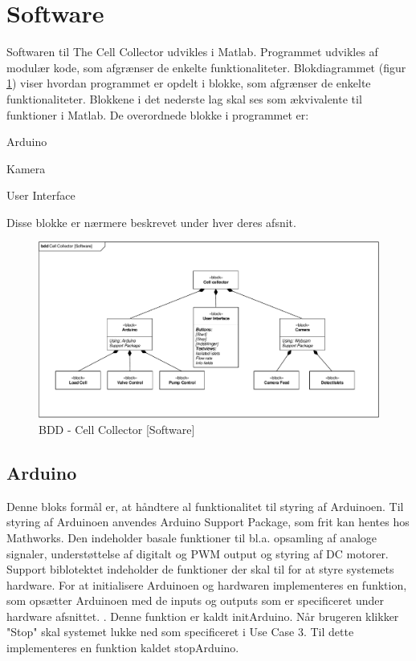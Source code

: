 \section{Software}
Softwaren til The Cell Collector udvikles i Matlab. Programmet udvikles af modulær kode, som afgrænser de enkelte funktionaliteter. Blokdiagrammet (figur \ref{fig:bdd_software}) viser hvordan programmet er opdelt i blokke, som afgrænser de enkelte funktionaliteter. Blokkene i det nederste lag skal ses som ækvivalente til funktioner i Matlab.  
De overordnede blokke i programmet er:

Arduino

Kamera

User Interface

Disse blokke er nærmere beskrevet under hver deres afsnit.
\begin{figure}[H]
	\centering
	\includegraphics[width=1\textwidth]{billeder/BDD_Software-crop.pdf}
	\caption{BDD - Cell Collector [Software]}
	\label{fig:bdd_software}
\end{figure}

\subsection{Arduino}
Denne bloks formål er, at håndtere al funktionalitet til styring af Arduinoen. Til styring af Arduinoen anvendes Arduino Support Package, som frit kan hentes hos Mathworks. Den indeholder basale funktioner til bl.a. opsamling af analoge signaler, understøttelse af digitalt og PWM output og styring af DC motorer. Support biblotektet indeholder de funktioner der skal til for at styre systemets hardware.
For at initialisere Arduinoen og hardwaren implementeres en funktion, som opsætter Arduinoen med de inputs og outputs som er specificeret under hardware afsnittet. . Denne funktion er kaldt initArduino. Når brugeren klikker "Stop" skal systemet lukke ned som specificeret i Use Case 3.  Til dette implementeres en funktion kaldet stopArduino. 

